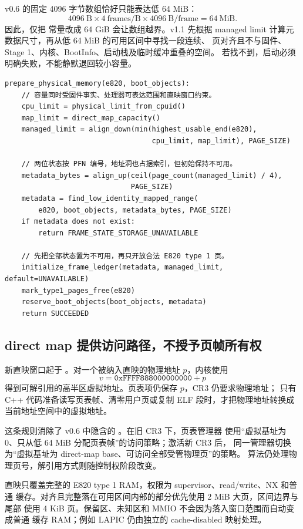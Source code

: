 v0.6 的固定 4096 字节数组恰好只能表达低 64 MiB：
\[
  4096\ \text{B}\times 4\ \text{frames/B}\times 4096\ \text{B/frame}
  =64\ \text{MiB}.
\]
因此，仅把  常量改成 64 GiB 会让数组越界。v1.1 先根据
managed limit 计算元数据尺寸，再从低 64 MiB 的可用区间中寻找一段连续、
页对齐且不与固件、Stage 1、内核、BootInfo、启动栈及临时缓冲重叠的空间。
若找不到，启动必须明确失败，不能静默退回较小容量。

\begin{lstlisting}
prepare_physical_memory(e820, boot_objects):
    // 容量同时受固件事实、处理器可表达范围和直映窗口约束。
    cpu_limit = physical_limit_from_cpuid()
    map_limit = direct_map_capacity()
    managed_limit = align_down(min(highest_usable_end(e820),
                                   cpu_limit, map_limit), PAGE_SIZE)

    // 两位状态按 PFN 编号，地址洞也占据索引，但初始保持不可用。
    metadata_bytes = align_up(ceil(page_count(managed_limit) / 4),
                              PAGE_SIZE)
    metadata = find_low_identity_mapped_range(
        e820, boot_objects, metadata_bytes, PAGE_SIZE)
    if metadata does not exist:
        return FRAME_STATE_STORAGE_UNAVAILABLE

    // 先把全部状态置为不可用，再只开放合法 E820 type 1 页。
    initialize_frame_ledger(metadata, managed_limit, default=UNAVAILABLE)
    mark_type1_pages_free(e820)
    reserve_boot_objects(boot_objects, metadata)
    return SUCCEEDED
\end{lstlisting}

\subsection{direct map 提供访问路径，不授予页帧所有权}

新直映窗口起于 。对一个被纳入直映的物理地址
\(p\)，内核使用
\[
  v=\mathtt{0xFFFF888000000000}+p
\]
得到可解引用的高半区虚拟地址。页表项仍保存 \(p\)，CR3 仍要求物理地址；
只有 C++ 代码准备读写页表帧、清零用户页或复制 ELF 段时，才把物理地址转换成
当前地址空间中的虚拟地址。

这条规则消除了 v0.6 中隐含的
。在旧 CR3 下，页表管理器
使用“虚拟基址为 0、只从低 64 MiB 分配页表帧”的访问策略；激活新 CR3 后，
同一管理器切换为“虚拟基址为 direct-map base、可访问全部受管物理页”的策略。
算法仍处理物理页号，解引用方式则随控制权阶段改变。

直映只覆盖完整的 E820 type 1 RAM，权限为 supervisor、read/write、NX 和普通
缓存。对齐且完整落在可用区间内部的部分优先使用 2 MiB 大页，区间边界与尾部
使用 4 KiB 页。保留区、未知区和 MMIO 不会因为落入窗口范围而自动变成普通
缓存 RAM；例如 LAPIC 仍由独立的 cache-disabled 映射处理。

